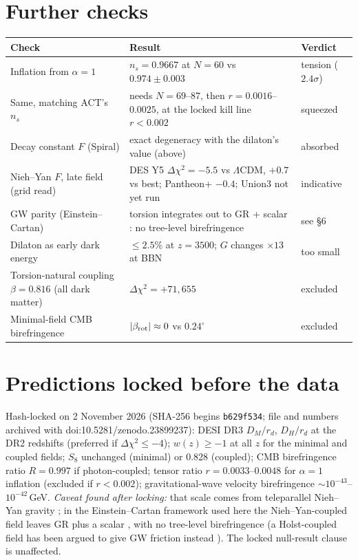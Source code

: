 \documentclass[11pt]{article}
\begin{document}
\section{Further checks}
\begin{center}\small
\begin{tabular}{p{}p{}p{}}
\toprule
Check & Result & Verdict\\
\midrule
Inflation from $\alpha=1$ & $n_s=0.9667$ at $N=60$ vs $0.974\pm0.003$ \cite{act2025} & tension ($2.4\sigma$)\\
Same, matching ACT's $n_s$ & needs $N=69$--$87$, then $r=0.0016$--$0.0025$, at the locked kill line $r<0.002$ & squeezed\\
Decay constant $F$ (Spiral) & exact degeneracy with the dilaton's value (above) & absorbed\\
Nieh--Yan $F$, late field (grid read) & DES Y5 $\Delta\chi^2=-5.5$ vs $\Lambda$CDM, $+0.7$ vs best; Pantheon+ $-0.4$; Union3 not yet run & indicative\\
GW parity (Einstein--Cartan) & torsion integrates out to GR + scalar \cite{calcagni2009}: no tree-level birefringence & see \S6\\
Dilaton as early dark energy & $\le2.5\%$ at $z=3500$; $G$ changes $\times13$ at BBN & too small\\
Torsion-natural coupling $\beta=0.816$ (all dark matter) & $\Delta\chi^2=+71{,}655$ & excluded\\
Minimal-field CMB birefringence & $|\beta_{\rm rot}|\approx0$ vs $0.24^\circ$ & excluded\\
\bottomrule
\end{tabular}
\end{center}

\section{Predictions locked before the data}
Hash-locked on 2 November 2026 (SHA-256 begins \texttt{b629f534}; file and numbers archived with
doi:10.5281/zenodo.23899237): DESI DR3 $D_M/r_d$, $D_H/r_d$ at the DR2 redshifts (preferred if $\Delta\chi^2\le-4$);
$w(z)\ge-1$ at all $z$ for the minimal and coupled fields; $S_8$ unchanged (minimal) or 0.828 (coupled); CMB
birefringence ratio $R=0.997$ if photon-coupled; tensor ratio $r=0.0033$--$0.0048$ for $\alpha=1$ inflation
(excluded if $r<0.002$); gravitational-wave velocity birefringence $\sim10^{-43}$--$10^{-42}$\,GeV. \emph{Caveat found after locking:} that scale comes
from teleparallel Nieh--Yan gravity \cite{lirao2020}; in the Einstein--Cartan framework used here the Nieh--Yan-coupled
field leaves GR plus a scalar \cite{calcagni2009}, with no tree-level birefringence (a Holst-coupled field has been argued to give GW friction instead \cite{gao2026}). The locked null-result clause is
unaffected.
\end{document}
